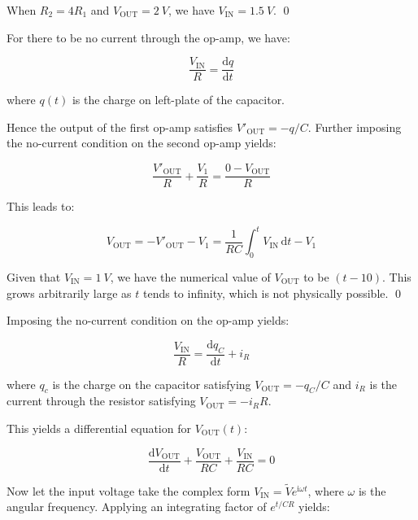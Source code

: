 \documentclass[12pt]{article}
\begin{document}
When $R_{2} = 4R_{1}$ and $V_{\text{OUT}} = \qty{2}{V}$, we have $V_{\text{IN}} = \qty{1.5}{V}$.
\qed


For there to be no current through the op-amp, we have:

\begin{equation}
    \frac{V_{\text{IN}}}{R} = \frac{\mathrm{d}q}{\mathrm{d}t}
\end{equation}

where $q(t)$ is the charge on left-plate of the capacitor.

Hence the output of the first op-amp satisfies $V'_{\text{OUT}} = -q/C$. Further imposing the no-current condition on the second op-amp yields:

\begin{equation}
    \frac{V'_{\text{OUT}}}{R} + \frac{V_{1}}{R} = \frac{0 - V_{\text{OUT}}}{R}
\end{equation}

This leads to:

\begin{equation}
    V_{\text{OUT}} = -V'_{\text{OUT}} - V_{1} = \frac{1}{RC} \int_{0}^{t} V_{\text{IN}} \, \mathrm{d}t - V_{1}
\end{equation}

Given that $V_{\text{IN}} = \qty{1}{V}$, we have the numerical value of $V_{\text{OUT}}$ to be $(t - 10)$. This grows arbitrarily large as $t$ tends to infinity, which is not physically possible.
\qed


Imposing the no-current condition on the op-amp yields:

\begin{equation}
    \frac{V_{\text{IN}}}{R} = \frac{\mathrm{d}q_{C}}{\mathrm{d}t} + i_{R}
\end{equation}

where $q_{c}$ is the charge on the capacitor satisfying $V_{\text{OUT}} = -q_{C}/C$ and $i_{R}$ is the current through the resistor satisfying $V_{\text{OUT}} = -i_{R}R$.

This yields a differential equation for $V_{\text{OUT}}(t)$:

\begin{equation}
    \frac{\mathrm{d}V_{\text{OUT}}}{\mathrm{d}t} + \frac{V_{\text{OUT}}}{RC} + \frac{V_{\text{IN}}}{RC} = 0
\end{equation}

Now let the input voltage take the complex form $V_{\text{IN}} = \tilde{V} e^{\mathrm{i} \omega t}$, where $\omega$ is the angular frequency. Applying an integrating factor of $e^{t/CR}$ yields:
\end{document}
